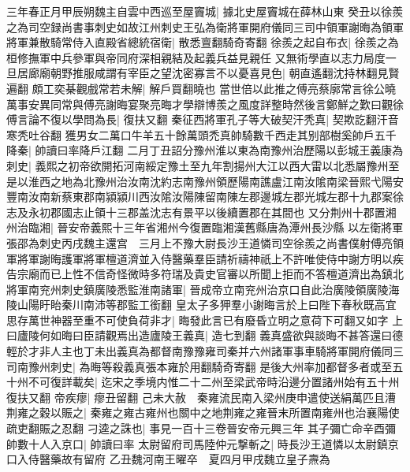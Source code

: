 三年春正月甲辰朔魏主自雲中西巡至屋竇城|{
	據北史屋竇城在薛林山東}
癸丑以徐羨之為司空録尚書事刺史如故江州刺史王弘為衛將軍開府儀同三司中領軍謝晦為領軍將軍兼散騎常侍入直殿省總統宿衛|{
	散悉亶翻騎奇寄翻}
徐羨之起自布衣|{
	徐羨之為桓修撫軍中兵參軍與帝同府深相親結及起義兵益見親任}
又無術學直以志力局度一旦居廊廟朝野推服咸謂有宰臣之望沈密寡言不以憂喜見色|{
	朝直遙翻沈持林翻見賢遍翻}
頗工奕棊觀戲常若未解|{
	解戶買翻曉也}
當世倍以此推之傅亮蔡廓常言徐公曉萬事安異同常與傅亮謝晦宴聚亮晦才學辯博羨之風度詳整時然後言鄭鮮之歎曰觀徐傅言論不復以學問為長|{
	復扶又翻}
秦征西將軍孔子等大破契汗秃真|{
	契欺訖翻汗音寒秃吐谷翻}
獲男女二萬口牛羊五十餘萬頭禿真帥騎數千西走其别部樹奚帥戶五千降秦|{
	帥讀曰率降戶江翻}
二月丁丑詔分豫州淮以東為南豫州治歷陽以彭城王義康為刺史|{
	義熙之初帝欲開拓河南綏定豫土至九年割揚州大江以西大雷以北悉屬豫州至是以淮西之地為北豫州治汝南沈約志南豫州領歷陽南譙盧江南汝隂南梁晉熙弋陽安豐南汝南新蔡東郡南潁潁川西汝隂汝陽陳留南陳左郡邊城左郡光城左郡十九郡案徐志及永初郡國志止領十三郡盖沈志有景平以後續置郡在其間也}
又分荆州十郡置湘州治臨湘|{
	晉安帝義熙十三年省湘州今復置臨湘漢舊縣唐為潭州長沙縣}
以左衛將軍張邵為刺史丙戌魏主還宫　三月上不豫大尉長沙王道憐司空徐羨之尚書僕射傅亮領軍將軍謝晦護軍將軍檀道濟並入侍醫藥羣臣請祈禱神祇上不許唯使侍中謝方明以疾告宗廟而已上性不信奇怪微時多符瑞及貴史官審以所聞上拒而不答檀道濟出為鎮北將軍南兖州刺史鎮廣陵悉監淮南諸軍|{
	晉成帝立南兖州治京口自此治廣陵領廣陵海陵山陽盱眙秦川南沛等郡監工銜翻}
皇太子多狎羣小謝晦言於上曰陛下春秋既高宜思存萬世神器至重不可使負荷非才|{
	晦發此言已有廢昏立明之意荷下可翻又如字}
上曰廬陵何如晦曰臣請觀焉出造廬陵王義真|{
	造七到翻}
義真盛欲與談晦不甚答還曰德輕於才非人主也丁未出義真為都督南豫豫雍司秦并六州諸軍事車騎將軍開府儀同三司南豫州刺史|{
	為晦等殺義真張本雍於用翻騎奇寄翻}
是後大州率加都督多者或至五十州不可復詳載矣|{
	迄宋之季境内惟二十二州至梁武帝時沿邊分置諸州始有五十州復扶又翻}
帝疾瘳|{
	瘳丑留翻}
己未大赦　秦雍流民南入梁州庚申遣使送絹萬匹且漕荆雍之穀以賑之|{
	秦雍之雍古雍州也關中之地荆雍之雍晉末所置南雍州也治襄陽使疏吏翻賑之忍翻}
刁逵之誅也|{
	事見一百十三卷晉安帝元興三年}
其子彌亡命辛酉彌帥數十人入京口|{
	帥讀曰率}
太尉留府司馬陸仲元撃斬之|{
	時長沙王道憐以太尉鎮京口入侍醫藥故有留府}
乙丑魏河南王曜卒　夏四月甲戌魏立皇子燾為

